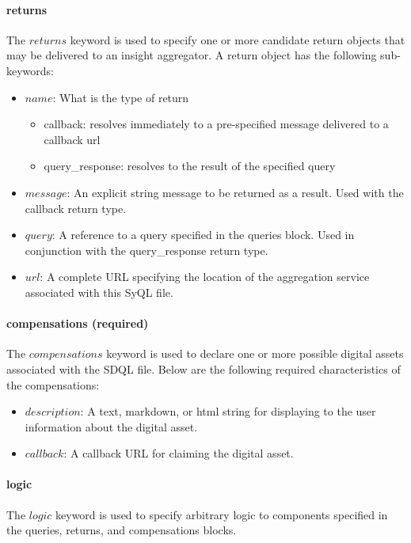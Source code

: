 \paragraph{returns}

The $returns$ keyword is used to specify one or more candidate return objects that may be delivered to an insight aggregator. A return object has the following sub-keywords:
\begin{itemize}
    \item $name$: What is the type of return
    \begin{itemize}
        \item callback: resolves immediately to a pre-specified message delivered to a callback url
        \item query\_response: resolves to the result of the specified query
    \end{itemize}
    \item $message$: An explicit string message to be returned as a result. Used with the callback return type.
    \item $query$: A reference to a query specified in the queries block. Used in conjunction with the query\_response return type.
    \item $url$: A complete URL specifying the location of the aggregation service associated with this SyQL file.
\end{itemize}

\paragraph{compensations (required)}

The $compensations$ keyword is used to declare one or more possible digital assets associated with the SDQL file. Below are the following required characteristics of the compensations:

\begin{itemize}
    \item $description$: A text, markdown, or html string for displaying to the user information about the digital asset.
    \item $callback$: A callback URL for claiming the digital asset.
\end{itemize}

\paragraph{logic}

The $logic$ keyword is used to specify arbitrary logic to components specified in the queries, returns, and compensations blocks.

